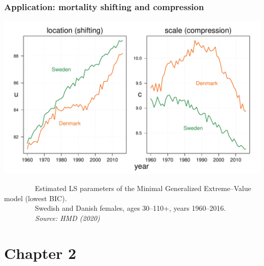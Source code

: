 \documentclass[12pt, xcolor=table]{beamer}  %
\begin{document}
\begin{frame}\frametitle{Application: mortality shifting and compression}
\vspace{-0.25cm}
\begin{center}
\includegraphics[scale=0.45]{Figures/Ch1/F3_b}
\end{center}
\vspace{-0.3cm}
\tiny{$\quad\quad\quad\quad$ Estimated LS parameters of the Minimal Generalized Extreme--Value model (lowest BIC).\\ $\quad\quad\quad\quad$ Swedish and Danish females, ages 30--110+, years 1960--2016. \\ \emph{$\quad\quad\quad\quad$ Source: HMD (2020)}} 
\end{frame}

\section{Chapter 2}
\end{document}
